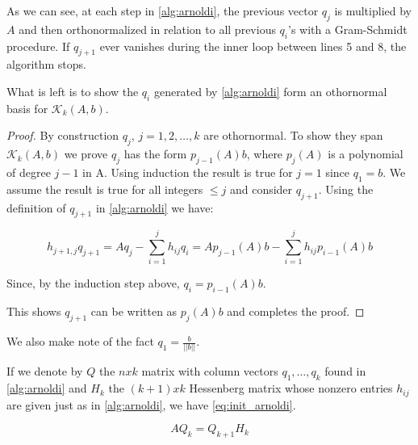 As we can see, at each step in \ref{alg:arnoldi}, the previous vector $q_{j}$ is multiplied by $A$ and then orthonormalized in relation to all previous $q_{i}$'s with a Gram-Schmidt procedure. If $q_{j+1}$ ever vanishes during the inner loop between lines 5 and 8, the algorithm stops.

What is left is to show the $q_{i}$ generated by \ref{alg:arnoldi} form an othornormal basis for $\mathcal{K}_{k}(A,b)$.

\begin{proof}\label{proof:arnoldi}
    By construction $q_{j}$, $j = 1,2,\dots, k$ are othornormal. To show they span $\mathcal{K}_{k}(A,b)$ we prove $q_{j}$ has the form $p_{j-1}(A)b$, where $p_{j}(A)$ is a polynomial of degree $j-1$ in A.
    Using induction the result is true for $j=1$ since $q_{1} = b$. We assume the result is true for all integers $\leq j$ and consider $q_{j+1}$. Using the definition of $q_{j+1}$ in \ref{alg:arnoldi} we have:

    \begin{equation}
        h_{j+1, j}q_{j+1} = Aq_{j} - \sum_{i=1}^{j} h_{ij}q_{i} = Ap_{j-1}(A)b - \sum_{i=1}^{j} h_{ij}p_{i-1}(A)b
    \end{equation}

    Since, by the induction step above, $q_{i} = p_{i-1}(A)b$.

    This shows $q_{j+1}$ can be written as $p_{j}(A)b$ and completes the proof.
\end{proof}

We also make note of the fact $q_{1} = \frac{b}{||b||}$.

If we denote by $Q$ the $n x k$ matrix with column vectors $q_{1}, \dots, q_{k}$ found in \ref{alg:arnoldi} and $H_{k}$ the $(k + 1)x k$ Hessenberg matrix whose nonzero entries $h_{ij}$ are given just as in \ref{alg:arnoldi}, we have \ref{eq:init_arnoldi}.

\begin{equation} \label{eq:init_arnoldi}
    AQ_{k} = Q_{k+1}H_{k}
\end{equation}

